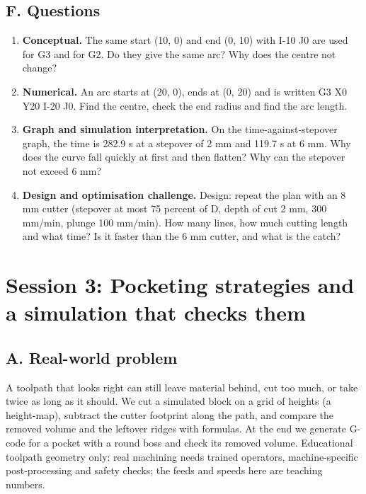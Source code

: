 \documentclass[11pt,a4paper]{article}
\begin{document}
\subsection*{F. Questions}
\begin{enumerate}[nosep]
\item \textbf{Conceptual.} The same start (10, 0) and end (0, 10) with I-10 J0 are used for G3 and for G2. Do they give the same arc? Why does the centre not change?
\item \textbf{Numerical.} An arc starts at (20, 0), ends at (0, 20) and is written G3 X0 Y20 I-20 J0. Find the centre, check the end radius and find the arc length.
\item \textbf{Graph and simulation interpretation.} On the time-against-stepover graph, the time is 282.9 s at a stepover of 2 mm and 119.7 s at 6 mm. Why does the curve fall quickly at first and then flatten? Why can the stepover not exceed 6 mm?
\item \textbf{Design and optimisation challenge.} Design: repeat the plan with an 8 mm cutter (stepover at most 75 percent of D, depth of cut 2 mm, 300 mm/min, plunge 100 mm/min). How many lines, how much cutting length and what time? Is it faster than the 6 mm cutter, and what is the catch?
\end{enumerate}

\section{Session 3: Pocketing strategies and a simulation that checks them}

\subsection*{A. Real-world problem}
A toolpath that looks right can still leave material behind, cut too much, or take twice as long as it should. We cut a simulated block on a grid of heights (a height-map), subtract the cutter footprint along the path, and compare the removed volume and the leftover ridges with formulas. At the end we generate G-code for a pocket with a round boss and check its removed volume. Educational toolpath geometry only: real machining needs trained operators, machine-specific post-processing and safety checks; the feeds and speeds here are teaching numbers.
\end{document}
